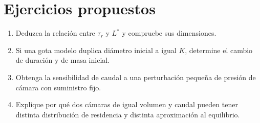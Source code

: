 \section{Ejercicios propuestos}
\begin{enumerate}
\item Deduzca la relación entre $\tau_r$ y $L^*$ y compruebe sus dimensiones.
\item Si una gota modelo duplica diámetro inicial a igual $K$, determine el cambio de duración y de masa inicial.
\item Obtenga la sensibilidad de caudal a una perturbación pequeña de presión de cámara con suministro fijo.
\item Explique por qué dos cámaras de igual volumen y caudal pueden tener distinta distribución de residencia y distinta aproximación al equilibrio.
\end{enumerate}


\studiumchaptercheck
